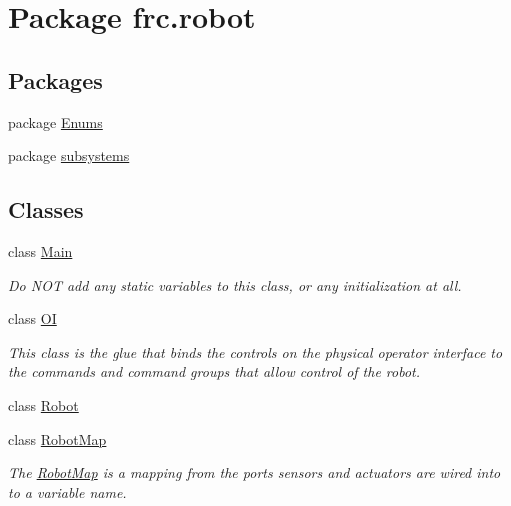 \hypertarget{namespacefrc_1_1robot}{}\section{Package frc.\+robot}
\label{namespacefrc_1_1robot}
\subsection*{Packages}
\begin{DoxyCompactItemize}
\item 
package \hyperlink{namespacefrc_1_1robot_1_1_enums}{Enums}
\item 
package \hyperlink{namespacefrc_1_1robot_1_1subsystems}{subsystems}
\end{DoxyCompactItemize}
\subsection*{Classes}
\begin{DoxyCompactItemize}
\item 
class \hyperlink{classfrc_1_1robot_1_1_main}{Main}
\begin{DoxyCompactList}\small\item\em Do N\+OT add any static variables to this class, or any initialization at all. \end{DoxyCompactList}\item 
class \hyperlink{classfrc_1_1robot_1_1_o_i}{OI}
\begin{DoxyCompactList}\small\item\em This class is the glue that binds the controls on the physical operator interface to the commands and command groups that allow control of the robot. \end{DoxyCompactList}\item 
class \hyperlink{classfrc_1_1robot_1_1_robot}{Robot}
\item 
class \hyperlink{classfrc_1_1robot_1_1_robot_map}{Robot\+Map}
\begin{DoxyCompactList}\small\item\em The \hyperlink{classfrc_1_1robot_1_1_robot_map}{Robot\+Map} is a mapping from the ports sensors and actuators are wired into to a variable name. \end{DoxyCompactList}\end{DoxyCompactItemize}
